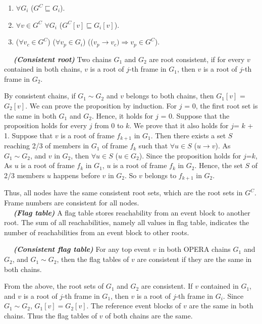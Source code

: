 \documentclass{article}
\newcommand{\dfnn}[2]{$\quad$ \textbf{\emph{(#1)}} {#2}}
\newcommand{\hbefore}{\rightarrow}
\begin{document}
\begin{enumerate}[(1)]
	\item $\forall G_i$ ($G^C \sqsubseteq G_i$).
	\item
	$\forall v \in G^C$ $\forall G_i$ ($G^C[v] \sqsubseteq G_i[v]$).
	\item
	($\forall v_c \in G^C$) ($\forall v_p \in G_i$) (($v_p \hbefore v_c) \Rightarrow v_p \in G^C$).
\end{enumerate}


\dfnn{Consistent root}{Two chains $G_1$ and $G_2$ are root consistent, if for every $v$ contained in both chains, $v$ is a root of $j$-th frame in $G_1$, then $v$ is a root of $j$-th frame in $G_2$.}

By consistent chains, if $G_1 \sim G_2$ and $v$ belongs to both chains, then $G_1[v]$ = $G_2[v]$.
We can prove the proposition by induction. For $j$ = 0, the first root set is the same in both $G_1$ and $G_2$. Hence, it holds for $j$ = 0. Suppose that the proposition holds for every $j$ from 0 to $k$. We prove that it also holds for $j$= $k$ + 1.
Suppose that $v$ is a root of frame $f_{k+1}$ in $G_1$. 
Then there exists a set $S$ reaching 2/3 of members in $G_1$ of frame $f_k$ such that $\forall u \in S$ ($u\hbefore v$). As $G_1 \sim G_2$, and $v$ in $G_2$, then $\forall u \in S$ ($u \in G_2$). Since the proposition holds for $j$=$k$, 
As $u$ is a root of frame $f_{k}$ in $G_1$, $u$ is a root of frame $f_k$ in $G_2$. Hence, the set $S$ of 2/3 members $u$ happens before $v$ in $G_2$. So $v$ belongs to $f_{k+1}$ in $G_2$.
	
Thus, all nodes have the same consistent root sets, which are the root sets in $G^C$. Frame numbers are consistent for all nodes.\\

\dfnn{Flag table}{A flag table stores reachability from an event block to another root. The sum of all reachabilities, namely all values in flag table, indicates the number of reachabilities from an event block to other roots.}

\dfnn{Consistent flag table}{For any top event $v$ in both OPERA chains $G_1$ and $G_2$, and $G_1 \sim G_2$, then the flag tables of $v$ are consistent if they are the same in both chains.}

From the above, the root sets of $G_1$ and $G_2$ are consistent. If $v$ contained in $G_1$, and $v$ is a root of $j$-th frame in $G_1$, then $v$ is a root of $j$-th frame in $G_i$. Since $G_1 \sim G_2$, $G_1[v] = G_2[v]$. The reference event blocks of $v$ are the same in both chains. Thus the flag tables of $v$ of both chains are the same.\\
\end{document}
